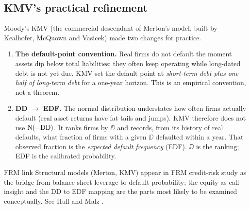 \subsection{KMV's practical refinement}
Moody's KMV (the commercial descendant of Merton's model, built by Kealhofer, McQuown and Vasicek) \cite{crosbie2003} made two changes for practice.
\begin{enumerate}
\item \textbf{The default-point convention.} Real firms do not default the moment assets dip below total liabilities; they often keep operating while long-dated debt is not yet due. KMV set the default point at \emph{short-term debt plus one half of long-term debt} for a one-year horizon. This is an empirical convention, not a theorem.
\item \textbf{DD $\to$ EDF.} The normal distribution understates how often firms actually default (real asset returns have fat tails and jumps). KMV therefore does not use $\mathrm{N}(-\mathrm{DD})$. It ranks firms by $\DD$ and records, from its history of real defaults, what fraction of firms with a given $\DD$ defaulted within a year. That observed fraction is the \emph{expected default frequency} (EDF). $\DD$ is the ranking; EDF is the calibrated probability.
\end{enumerate}

\begin{keybox}{FRM link}
Structural models (Merton, KMV) appear in FRM credit-risk study as the bridge from balance-sheet leverage to default probability; the equity-as-call insight and the DD to EDF mapping are the parts most likely to be examined conceptually. See Hull and Malz \cite{hull,malz2011}.
\end{keybox}
